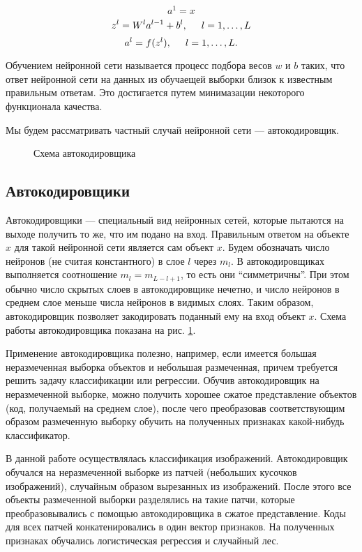 \documentclass[12pt]{article}
\begin{document}
		$$a^1 = x$$
		$$z^l = W^l a^{l-1} + b^l, \hspace{0.5cm}l = 1, \ldots, L$$
		$$a^l = f(z^l), \hspace{0.5cm}l = 1, \ldots, L.$$


		Обучением нейронной сети называется процесс подбора весов $w$ и $b$ таких, что ответ нейронной сети на данных из обучаещей выборки близок к известным правильным ответам. Это достигается путем минимазации некоторого функционала качества.

		Мы будем рассматривать частный случай нейронной сети — автокодировщик.

		\begin{figure}[h]
			\centerline{}
			\caption{Схема автокодировщика}
			\label{autoencoder}
		\end{figure}	

	\subsection{Автокодировщики}
		\hspace{0.6cm}Автокодировщики — специальный вид нейронных сетей, которые пытаются на выходе получить то же, что им подано на вход. Правильным ответом на объекте $x$ для такой нейронной сети является сам объект $x$. Будем обозначать число нейронов (не считая константного) в слое $l$ через $m_l$. В автокодировщиках выполняется соотношение $m_l = m_{L - l + 1}$, то есть они ``симметричны''. При этом обычно число скрытых слоев в автокодировщике нечетно, и число нейронов в среднем слое меньше числа нейронов в видимых слоях. Таким образом, автокодировщик позволяет закодировать поданный ему на вход объект $x$. Схема работы автокодировщика показана на рис. \ref{autoencoder}.


		Применение автокодировщика полезно, например, если имеется большая неразмеченная выборка объектов и небольшая размеченная, причем требуется решить задачу классификации или регрессии. Обучив автокодировщик на неразмеченной выборке, можно получить хорошее сжатое представление объектов (код, получаемый на среднем слое), после чего преобразовав соответствующим образом размеченную выборку обучить на полученных признаках какой-нибудь классификатор.

		В данной работе осуществлялась классификация изображений. Автокодировщик обучался на неразмеченной выборке из патчей (небольших кусочков изображений), случайным образом вырезанных из изображений. После этого все объекты размеченной выборки разделялись на такие патчи, которые преобразовывались с помощью автокодировщика в сжатое представление. Коды для всех патчей конкатенировались в один вектор признаков. На полученных признаках обучались логистическая регрессия и случайный лес.
\end{document}
